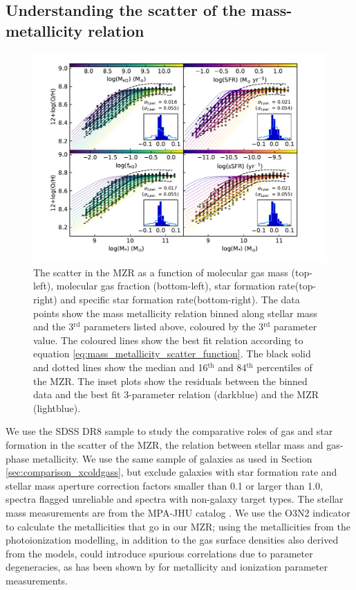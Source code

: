 \documentclass[fleqn,usenatbib]{mnras}
\begin{document}
\subsection{Understanding the scatter of the mass-metallicity relation}
\label{sec:MZR}

\begin{figure}
    \centering
    \includegraphics[width=2\columnwidth]{figures/fig11.pdf}
    \caption{The scatter in the MZR as a function of molecular gas mass (top-left), molecular gas fraction (bottom-left), star formation rate(top-right) and specific star formation rate(bottom-right). The data points show the mass metallicity relation binned along stellar mass and the 3$^{\textrm{rd}}$ parameters listed above, coloured by the 3$^{\textrm{rd}}$ parameter value. The coloured lines show the best fit relation according to equation \ref{eq:mass_metallicity_scatter_function}. The black solid and dotted lines show the median and 16$^{\textrm{th}}$ and 84$^{\textrm{th}}$ percentiles of the MZR. The inset plots show the residuals between the binned data and the best fit 3-parameter relation (darkblue) and the MZR (lightblue).}
    \label{fig:MZR_binned}
\end{figure}

We use the SDSS DR8 sample to study the comparative roles of gas and star formation in the scatter of the MZR, the relation between stellar mass and gas-phase metallicity. We use the same sample of galaxies as used in Section \ref{sec:comparison_xcoldgass}, but exclude galaxies with star formation rate and stellar mass aperture correction factors smaller than 0.1 or larger than 1.0, spectra flagged unreliable and spectra with non-galaxy target types. The stellar mass measurements are from the MPA-JHU catalog \citep{kauffmann2003a}. We use the \cite{pettini2004} O3N2 indicator to calculate the metallicities that go in our MZR; using the metallicities from the photoionization modelling, in addition to the gas surface densities also derived from the models, could introduce spurious correlations due to parameter degeneracies, as has been shown by \cite{mingozzi2020} for metallicity and ionization parameter measurements.
\end{document}
